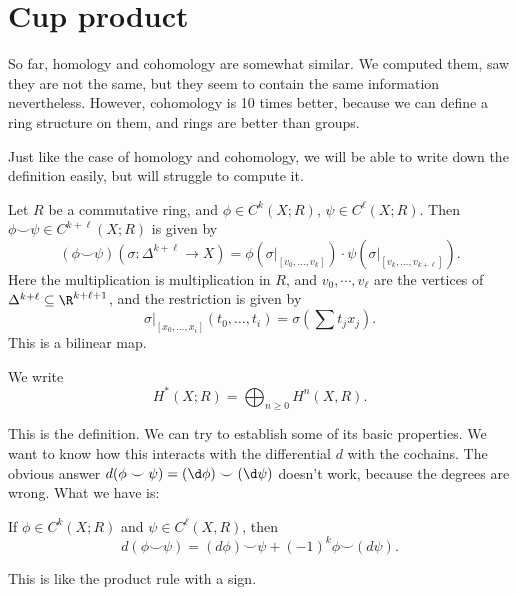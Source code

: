 \documentclass[a4paper]{article}
\begin{document}
\section{Cup product}
So far, homology and cohomology are somewhat similar. We computed them, saw they are not the same, but they seem to contain the same information nevertheless. However, cohomology is 10 times better, because we can define a ring structure on them, and rings are better than groups.

Just like the case of homology and cohomology, we will be able to write down the definition easily, but will struggle to compute it.

\begin{defi}\index{$\smile$}
  Let $R$ be a commutative ring, and $\phi \in C^k(X; R)$, $\psi \in C^\ell(X; R)$. Then $\phi \smile \psi \in C^{k + \ell}(X; R)$ is given by
  \[
    (\phi \smile \psi)(\sigma: \Delta^{k + \ell} \to X) = \phi(\sigma|_{[v_0, \ldots, v_k]}) \cdot \psi(\sigma|_{[v_k, \ldots, v_{k + \ell}]}).
  \]
  Here the multiplication is multiplication in $R$, and $v_0, \cdots, v_\ell$ are the vertices of $\Delta^{k + \ell} \subseteq \R^{k + \ell + 1}$, and the restriction is given by
  \[
    \sigma|_{[x_0, \ldots, x_i]} (t_0, \ldots, t_i) = \sigma\left(\sum t_j x_j\right).
  \]
  This is a bilinear map.
\end{defi}

\begin{notation}
  We write
  \[
    H^*(X; R) = \bigoplus_{n \geq 0} H^n(X, R).
  \]
\end{notation}
This is the definition. We can try to establish some of its basic properties. We want to know how this interacts with the differential $d$ with the cochains. The obvious answer $d(\phi \smile \psi) = (\d \phi) \smile (\d \psi)$ doesn't work, because the degrees are wrong. What we have is:

\begin{lemma}
  If $\phi \in C^k(X; R)$ and $\psi \in C^\ell(X, R)$, then
  \[
    d (\phi \smile \psi) = (d \phi)\smile \psi + (-1)^k \phi\smile(d \psi).
  \]
\end{lemma}
This is like the product rule with a sign.
\end{document}

